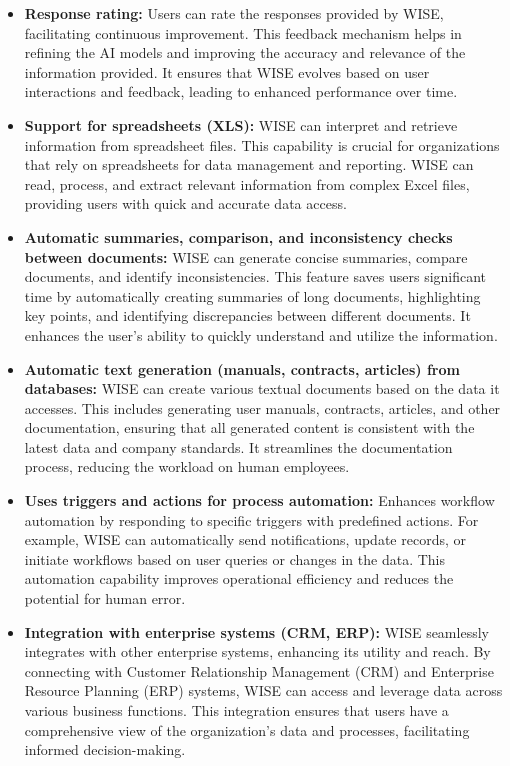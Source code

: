 \begin{itemize}
    \item \textbf{Response rating:} Users can rate the responses provided by WISE, facilitating continuous improvement. This feedback mechanism helps in refining the AI models and improving the accuracy and relevance of the information provided. It ensures that WISE evolves based on user interactions and feedback, leading to enhanced performance over time.
    
    \item \textbf{Support for spreadsheets (XLS):} WISE can interpret and retrieve information from spreadsheet files. This capability is crucial for organizations that rely on spreadsheets for data management and reporting. WISE can read, process, and extract relevant information from complex Excel files, providing users with quick and accurate data access.
    
    \item \textbf{Automatic summaries, comparison, and inconsistency checks between documents:} WISE can generate concise summaries, compare documents, and identify inconsistencies. This feature saves users significant time by automatically creating summaries of long documents, highlighting key points, and identifying discrepancies between different documents. It enhances the user's ability to quickly understand and utilize the information.
    
    \item \textbf{Automatic text generation (manuals, contracts, articles) from databases:} WISE can create various textual documents based on the data it accesses. This includes generating user manuals, contracts, articles, and other documentation, ensuring that all generated content is consistent with the latest data and company standards. It streamlines the documentation process, reducing the workload on human employees.
    
    \item \textbf{Uses triggers and actions for process automation:} Enhances workflow automation by responding to specific triggers with predefined actions. For example, WISE can automatically send notifications, update records, or initiate workflows based on user queries or changes in the data. This automation capability improves operational efficiency and reduces the potential for human error.
    
    \item \textbf{Integration with enterprise systems (CRM, ERP):} WISE seamlessly integrates with other enterprise systems, enhancing its utility and reach. By connecting with Customer Relationship Management (CRM) and Enterprise Resource Planning (ERP) systems, WISE can access and leverage data across various business functions. This integration ensures that users have a comprehensive view of the organization's data and processes, facilitating informed decision-making.
\end{itemize}

